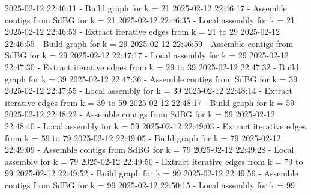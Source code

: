 \documentclass[
  letterpaper,
  DIV=11,
  numbers=noendperiod]{scrartcl}
\newenvironment{Shaded}{\begin{snugshade}}{\end{snugshade}}
\newcommand{\AttributeTok}[1]{\textcolor[rgb]{0.40,0.45,0.13}{#1}}
\newcommand{\ExtensionTok}[1]{\textcolor[rgb]{0.00,0.23,0.31}{#1}}
\newcommand{\NormalTok}[1]{\textcolor[rgb]{0.00,0.23,0.31}{#1}}
\begin{document}
\begin{Shaded}
\begin{Highlighting}[]
\ExtensionTok{2025{-}02{-}12}\NormalTok{ 22:46:11 }\AttributeTok{{-}}\NormalTok{ Build graph for k = 21 }
\ExtensionTok{2025{-}02{-}12}\NormalTok{ 22:46:17 }\AttributeTok{{-}}\NormalTok{ Assemble contigs from SdBG for k = 21}
\ExtensionTok{2025{-}02{-}12}\NormalTok{ 22:46:35 }\AttributeTok{{-}}\NormalTok{ Local assembly for k = 21}
\ExtensionTok{2025{-}02{-}12}\NormalTok{ 22:46:53 }\AttributeTok{{-}}\NormalTok{ Extract iterative edges from k = 21 to 29 }
\ExtensionTok{2025{-}02{-}12}\NormalTok{ 22:46:55 }\AttributeTok{{-}}\NormalTok{ Build graph for k = 29 }
\ExtensionTok{2025{-}02{-}12}\NormalTok{ 22:46:59 }\AttributeTok{{-}}\NormalTok{ Assemble contigs from SdBG for k = 29}
\ExtensionTok{2025{-}02{-}12}\NormalTok{ 22:47:17 }\AttributeTok{{-}}\NormalTok{ Local assembly for k = 29}
\ExtensionTok{2025{-}02{-}12}\NormalTok{ 22:47:30 }\AttributeTok{{-}}\NormalTok{ Extract iterative edges from k = 29 to 39 }
\ExtensionTok{2025{-}02{-}12}\NormalTok{ 22:47:32 }\AttributeTok{{-}}\NormalTok{ Build graph for k = 39 }
\ExtensionTok{2025{-}02{-}12}\NormalTok{ 22:47:36 }\AttributeTok{{-}}\NormalTok{ Assemble contigs from SdBG for k = 39}
\ExtensionTok{2025{-}02{-}12}\NormalTok{ 22:47:55 }\AttributeTok{{-}}\NormalTok{ Local assembly for k = 39}
\ExtensionTok{2025{-}02{-}12}\NormalTok{ 22:48:14 }\AttributeTok{{-}}\NormalTok{ Extract iterative edges from k = 39 to 59 }
\ExtensionTok{2025{-}02{-}12}\NormalTok{ 22:48:17 }\AttributeTok{{-}}\NormalTok{ Build graph for k = 59 }
\ExtensionTok{2025{-}02{-}12}\NormalTok{ 22:48:22 }\AttributeTok{{-}}\NormalTok{ Assemble contigs from SdBG for k = 59}
\ExtensionTok{2025{-}02{-}12}\NormalTok{ 22:48:40 }\AttributeTok{{-}}\NormalTok{ Local assembly for k = 59}
\ExtensionTok{2025{-}02{-}12}\NormalTok{ 22:49:03 }\AttributeTok{{-}}\NormalTok{ Extract iterative edges from k = 59 to 79 }
\ExtensionTok{2025{-}02{-}12}\NormalTok{ 22:49:05 }\AttributeTok{{-}}\NormalTok{ Build graph for k = 79 }
\ExtensionTok{2025{-}02{-}12}\NormalTok{ 22:49:09 }\AttributeTok{{-}}\NormalTok{ Assemble contigs from SdBG for k = 79}
\ExtensionTok{2025{-}02{-}12}\NormalTok{ 22:49:28 }\AttributeTok{{-}}\NormalTok{ Local assembly for k = 79}
\ExtensionTok{2025{-}02{-}12}\NormalTok{ 22:49:50 }\AttributeTok{{-}}\NormalTok{ Extract iterative edges from k = 79 to 99 }
\ExtensionTok{2025{-}02{-}12}\NormalTok{ 22:49:52 }\AttributeTok{{-}}\NormalTok{ Build graph for k = 99 }
\ExtensionTok{2025{-}02{-}12}\NormalTok{ 22:49:56 }\AttributeTok{{-}}\NormalTok{ Assemble contigs from SdBG for k = 99}
\ExtensionTok{2025{-}02{-}12}\NormalTok{ 22:50:15 }\AttributeTok{{-}}\NormalTok{ Local assembly for k = 99}

\end{Highlighting}
\end{Shaded}
\end{document}

